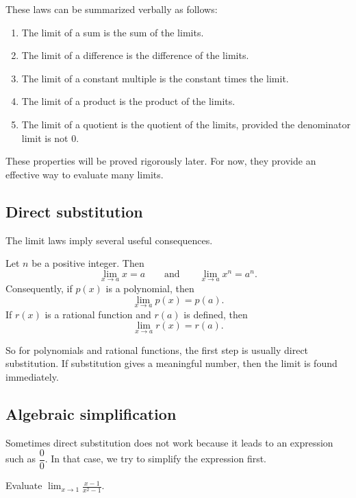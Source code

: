 \begin{remark}
These laws can be summarized verbally as follows:
\begin{enumerate}
    \item The limit of a sum is the sum of the limits.
    \item The limit of a difference is the difference of the limits.
    \item The limit of a constant multiple is the constant times the limit.
    \item The limit of a product is the product of the limits.
    \item The limit of a quotient is the quotient of the limits, provided the denominator limit is not \(0\).
\end{enumerate}
\end{remark}

\begin{remark}
These properties will be proved rigorously later. For now, they provide an effective way to evaluate many limits.
\end{remark}

\subsection{Direct substitution}

The limit laws imply several useful consequences.

\begin{proposition}
Let \(n\) be a positive integer. Then
\[
\lim_{x\to a}x=a
\qquad \text{and} \qquad
\lim_{x\to a}x^{n}=a^{n}.
\]
Consequently, if \(p(x)\) is a polynomial, then
\[
\lim_{x\to a}p(x)=p(a).
\]
If \(r(x)\) is a rational function and \(r(a)\) is defined, then
\[
\lim_{x\to a}r(x)=r(a).
\]
\end{proposition}

So for polynomials and rational functions, the first step is usually direct substitution. If substitution gives a meaningful number, then the limit is found immediately.

\subsection{Algebraic simplification}

Sometimes direct substitution does not work because it leads to an expression such as \(\dfrac{0}{0}\). In that case, we try to simplify the expression first.

\begin{example}
Evaluate
\(\displaystyle
\lim_{x\to 1}\frac{x-1}{x^{2}-1}.
\)
\end{example}

